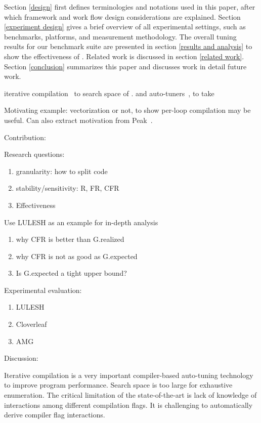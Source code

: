 \iffalse
{}
Section \ref{design} first defines terminologies and notations used in this paper, after which \toolname framework and work flow design considerations are explained.
Section \ref{experiment design} gives a brief overview of all experimental settings, such as benchmarks, platforms, and measurement methodology.
The overall tuning results for our benchmark suite are presented in section \ref{results and analysis} to show the effectiveness of \toolname.
Related work is discussed in section \ref{related work}.
Section \ref{conclusion} summarizes this paper and discusses work in detail future work.

iterative compilation~\cite{iterativecompilation, 1191546, 1611551} to search  space of . and auto-tuners~\cite{activeHarmony, opentuner, Zhang:2012:AAS:2259016.2259037}, to take

Motivating example: vectorization or not, to show per-loop compilation may be useful. Can also extract motivation from Peak~\cite{Pan:2008:taco}.

Contribution:

Research questions:
\begin{enumerate}
\item granularity: how to split code
\item stability/sensitivity: R, FR, CFR
\item Effectiveness
\end{enumerate}

Use LULESH as an example for in-depth analysis
\begin{enumerate}
\item why CFR is better than G.realized
\item why CFR is not as good as G.expected
\item Is G.expected a tight upper bound?
\end{enumerate}

Experimental evaluation:
\begin{enumerate}
\item LULESH
\item Cloverleaf
\item AMG
\end{enumerate}

Discussion:

Iterative compilation is a very important compiler-based auto-tuning technology to improve program performance. Search space is too large for exhaustive enumeration. The critical limitation of the state-of-the-art is lack of knowledge of interactions among different compilation flags. It is challenging to automatically derive compiler flag interactions.

